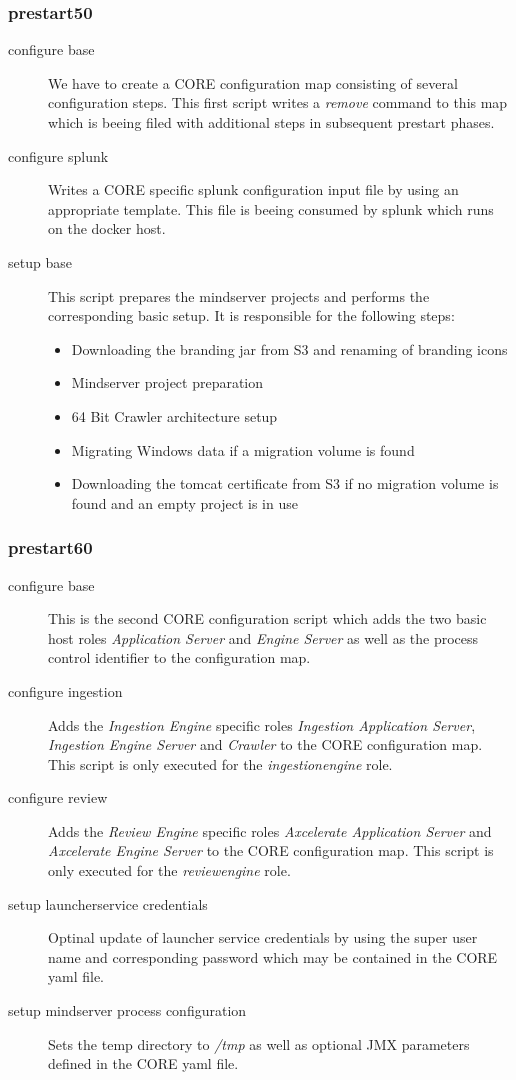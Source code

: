 			\subsubsection{prestart50}
			\begin{description}
				\item[configure base] We have to create a CORE configuration map consisting of several configuration steps. This first script writes a \emph{remove} command to this map which is beeing filed with additional steps in subsequent prestart phases.
				\item[configure splunk] Writes a CORE specific splunk configuration input file by using an appropriate template. This file is beeing consumed by splunk which runs on the docker host.
				\item[setup base] This script prepares the mindserver projects and performs the corresponding basic setup. It is responsible for the following steps:
				\begin{itemize}
					\item Downloading the branding jar from S3 and renaming of branding icons
					\item Mindserver project preparation
					\item 64 Bit Crawler architecture setup
					\item Migrating Windows data if a migration volume is found
					\item Downloading the tomcat certificate from S3 if no migration volume is found and an empty project is in use
				\end{itemize}
			\end{description}
			\subsubsection{prestart60}
			\begin{description}
				\item[configure base] This is the second CORE configuration script which adds the two basic host roles \emph{Application Server} and \emph{Engine Server} as well as the process control identifier to the configuration map.
				\item[configure ingestion] Adds the \emph{Ingestion Engine} specific roles  \emph{Ingestion Application Server}, \emph{Ingestion Engine Server} and \emph{Crawler} to the CORE configuration map. This script is only executed for the \emph{ingestionengine} role.
				\item[configure review] Adds the \emph{Review Engine} specific roles  \emph{Axcelerate Application Server} and \emph{Axcelerate Engine Server} to the CORE configuration map. This script is only executed for the \emph{reviewengine} role.
				\item[setup launcherservice credentials] Optinal update of launcher service credentials by using the super user name and corresponding password which may be contained in the CORE yaml file.
				\item[setup mindserver process configuration] Sets the temp directory to \emph{/tmp} as well as optional JMX parameters defined in the CORE yaml file.
			\end{description}
